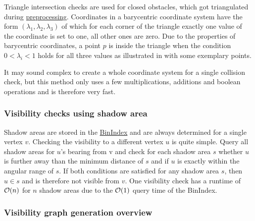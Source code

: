 			Triangle intersection checks are used for closed obstacles, which got triangulated during \hyperref[subsec:step-1-preprocessing]{preprocessing}.
			Coordinates in a barycentric coordinate system have the form $(\lambda_1,\lambda_2,\lambda_3)$ of which for each corner of the triangle exactly one value of the coordinate is set to one, all other ones are zero.
			Due to the properties of barycentric coordinates, a point $p$ is inside the triangle when the condition $0 < \lambda_i < 1$ holds for all three values as illustrated in  with some exemplary points.
			
			It may sound complex to create a whole coordinate system for a single collision check, but this method only uses a few multiplications, additions and boolean operations and is therefore very fast.
			
		\subsubsection{Visibility checks using shadow area}
			
			Shadow areas are stored in the \hyperref[subsec:binindex]{BinIndex} and are always determined for a single vertex $v$.
			Checking the visibility to a different vertex $u$ is quite simple.
			Query all shadow areas for $u$'s bearing from v and check for each shadow area $s$ whether $u$ is further away than the minimum distance of $s$ and if $u$ is exactly within the angular range of $s$.
			If both conditions are satisfied for any shadow area $s$, then $u \in s$ and is therefore not visible from $v$.
			One visibility check has a runtime of $\mathcal{O}(n)$ for $n$ shadow areas due to the $\mathcal{O}(1)$ query time of the BinIndex.
		
		\subsubsection{Visibility graph generation overview}
		
